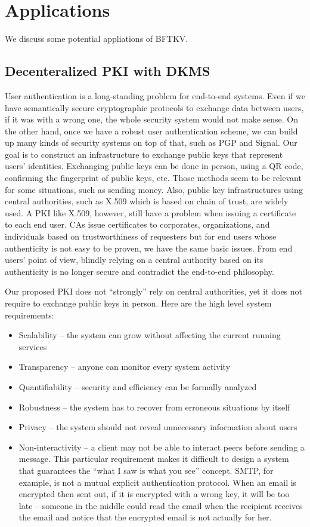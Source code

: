 \documentclass[twoside,twocolumn,10pt,fleqn]{article}
\begin{document}
\section{Applications}

We discuss some potential appliations of BFTKV.

\subsection{Decenteralized PKI with DKMS}

User authentication is a long-standing problem for end-to-end
systems. Even if we have semantically secure cryptographic protocols
to exchange data between users, if it was with a wrong one, the whole
security system would not make sense. On the other hand, once we have
a robust user authentication scheme, we can build up many kinds of
security systems on top of that, such as PGP and Signal. Our goal is
to construct an infrastructure to exchange public keys that represent
users' identities. Exchanging public keys can be done in person,
using a QR code, confirming the fingerprint of public keys, etc. Those
methods seem to be relevant for some situations, such as sending
money. Also, public key infrastructures using central authorities,
such as X.509 which is based on chain of trust, are widely used. A PKI
like X.509, however, still have a problem when issuing a certificate
to each end user. CAs issue certificates to corporates, organizations,
and individuals based on trustworthiness of requesters but for end
users whose authenticity is not easy to be proven, we have the same
basic issues. From end users' point of view, blindly relying on a
central authority based on its authenticity is no longer secure and
contradict the end-to-end philosophy.

Our proposed PKI does not ``strongly'' rely on central authorities,
yet it does not require to exchange public keys in person. Here are
the high level system requirements:
\begin{itemize}
\item Scalability -- the system can grow without affecting the current running services
\item Transparency -- anyone can monitor every system activity
\item Quantifiability -- security and efficiency can be formally analyzed
\item Robustness -- the system has to recover from erroneous situations by itself
\item Privacy -- the system should not reveal unnecessary information about users
\item Non-interactivity -- a client may not be able to interact peers
before sending a message. This particular requirement makes it
difficult to design a system that guarantees the ``what I saw is what
you see'' concept. SMTP, for example, is not a mutual explicit
authentication protocol. When an email is encrypted then sent out, if
it is encrypted with a wrong key, it will be too late -- someone in
the middle could read the email when the recipient receives the email
and notice that the encrypted email is not actually for her.
\end{itemize}
\end{document}
